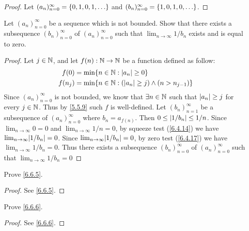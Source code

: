 \begin{proof}
  Let \((a_n)_{n = 0}^\infty = \set{0, 1, 0, 1, \dots}\) and \((b_n)_{n = 0}^\infty = \set{1, 0, 1, 0, \dots}\).
\end{proof}

\begin{ex}\label{ex:6.6.3}
  Let \((a_n)_{n = 0}^\infty\) be a sequence which is not bounded.
  Show that there exists a subsequence \((b_n)_{n = 0}^\infty\) of \((a_n)_{n = 0}^\infty\) such that \(\lim_{n \to \infty} 1 / b_n\) exists and is equal to zero.
\end{ex}

\begin{proof}
  Let \(j \in \mathbb{N}\), and let \(f(n) : \mathbb{N} \to \mathbb{N}\) be a function defined as follow:
  \begin{align*}
    f(0)   & = \min\set{n \in \N : \abs{a_n} \geq 0}                         \\
    f(n_j) & = \min\set{n \in \N : (\abs{a_n} \geq j) \land (n > n_{j - 1})}
  \end{align*}
  Since \((a_n)_{n = 0}^\infty\) is not bounded, we know that \(\exists n \in \mathbb{N}\) such that \(\left\lvert a_n\right\rvert \geq j\) for every \(j \in \mathbb{N}\).
  Thus by \cref{5.5.9} such \(f\) is well-defined.
  Let \((b_n)_{n = 1}^\infty\) be a subsequence of \((a_n)_{n = 0}^\infty\) where \(b_n = a_{f(n)}\).
  Then \(0 \leq \left\lvert1 / b_n\right\rvert \leq 1 / n\).
  Since \(\lim_{n \to \infty} 0 = 0\) and \(\lim_{n \to \infty} 1 / n = 0\), by squeeze test (\cref{6.4.14}) we have \(\lim_{n \to \infty} \abs{1 / b_n} = 0\).
  Since \(\lim_{n \to \infty} \abs{1 / b_n} = 0\), by zero test (\cref{6.4.17}) we have \(\lim_{n \to \infty} 1 / b_n = 0\).
  Thus there exists a subsequence \((b_n)_{n = 0}^\infty\) of \((a_n)_{n = 0}^\infty\) such that \(\lim_{n \to \infty} 1 / b_n = 0\)
\end{proof}

\begin{ex}\label{ex:6.6.4}
  Prove \cref{6.6.5}.
\end{ex}

\begin{proof}
  See \cref{6.6.5}.
\end{proof}

\begin{ex}\label{ex:6.6.5}
  Prove \cref{6.6.6}.
\end{ex}

\begin{proof}
  See \cref{6.6.6}.
\end{proof}
